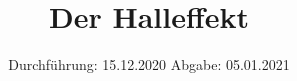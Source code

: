 

\subject{106}
\title{Der Halleffekt}
\date{%
  Durchführung: 15.12.2020
  \hspace{3em}
  Abgabe: 05.01.2021
}



\maketitle
\thispagestyle{empty}
\tableofcontents
\newpage







\printbibliography{}


